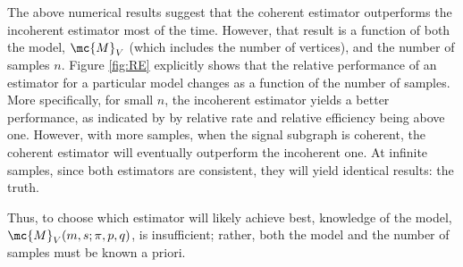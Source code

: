 \documentclass[10pt,journal,cspaper,compsoc]{IEEEtran}
\begin{document}
The above numerical results suggest that the coherent estimator outperforms the incoherent estimator most of the time.  However, that result is a function of both the model, $\mc{M}_V$ (which includes the number of vertices), and the number of samples $n$.  %
Figure \ref{fig:RE} explicitly shows that the relative performance of an estimator for a particular model changes as a function of the number of samples.  More specifically, for small $n$, the incoherent estimator yields a better performance, as indicated by by relative rate and relative efficiency being above one.  However, with more samples, when the signal subgraph is coherent, the coherent estimator will eventually outperform the incoherent one.  At infinite samples, since both estimators are consistent, they will yield identical results: the truth.  

Thus, to choose which estimator will likely achieve best, knowledge of the model, $\mc{M}_V(m,s;\pi,p,q)$, is insufficient; rather, both the model and the number of samples must be known a priori.  
\end{document}
